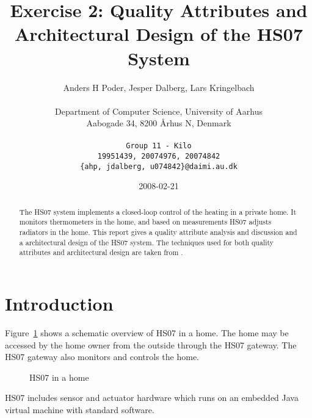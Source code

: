 \documentclass[a4paper,10pt]{article}
\begin{document}
\title{Exercise 2: Quality Attributes and Architectural Design of the HS07 System}

\author{
  Anders H Poder, Jesper Dalberg, Lars Kringelbach\\\\
  Department of Computer Science, University of Aarhus\\
  Aabogade 34, 8200 {\AA}rhus N, Denmark\\\\
  \makeatletter
  \texttt{Group 11 - Kilo}\\
  \texttt{19951439, 20074976, 20074842}\\
  \texttt{\{ahp, jdalberg, u074842\}@daimi.au.dk}
}

\date{2008-02-21}

\maketitle

\begin{abstract}
  The HS07 system implements a closed-loop control of the heating in a
  private home. It monitors thermometers in the home, and based on
  measurements HS07 adjusts radiators in the home. This report gives a
  quality attribute analysis and discussion and a architectural design of 
  the HS07 system. The techniques used for both quality attributes and 
  architectural design are taken from \cite{bass2003sa}.
\end{abstract}

\section{Introduction}

Figure~\ref{fig:hs07} shows a schematic overview of HS07 in a
home. The home may be accessed by the home owner from the outside
through the HS07 gateway. The HS07 gateway also monitors and controls
the home.
\begin{figure}[!htb]
\centerline{}
\caption{HS07 in a home}
\label{fig:hs07}
\end{figure}

HS07 includes sensor and actuator hardware which runs on an embedded Java virtual
machine with standard software.

\end{document}
